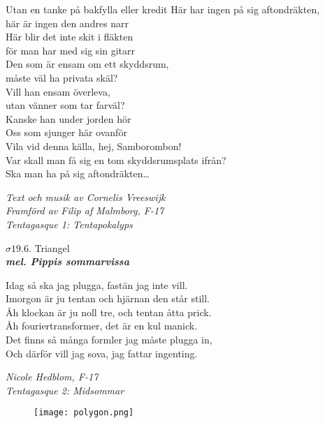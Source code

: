 \documentclass[a6paper,10pt]{article}
\newcommand{\mel}[1]{\small\textbf{\textit{mel. #1 \\}}}
\begin{document}
Utan en tanke på bakfylla eller kredit
\newpage
\setlength{\oddsidemargin}{-0.37in}
\noindent
Här har ingen på sig aftondräkten,\\
här är ingen den andres narr\\
Här blir det inte skit i fläkten\\
för man har med sig sin gitarr
\vspace{5pt}\\
Den som är ensam om ett skyddsrum,\\
måste väl ha privata skäl?\\
Vill han ensam överleva,\\
utan vänner som tar farväl?\\
Kanske han under jorden hör\\
Oss som sjunger här ovanför\\
Vila vid denna källa, hej, Samborombon!\\
Var skall man få sig en tom skyddsrumsplats ifrån?
\vspace{5pt}\\
Ska man ha på sig aftondräkten… 


\begin{flushright}
\textit{Text och musik av Cornelis Vreeswijk\\
Framförd av Filip af Malmborg, F-17\\ Tentagasque 1: Tentapokalyps}
\end{flushright}

\setlength{\oddsidemargin}{-0.47in}

\begin{center}
\Large $\sigma19.6$. Triangel\\
\mel{Pippis sommarvissa}
\end{center}\small 
Idag så ska jag plugga, fastän jag inte vill.\\
Imorgon är ju tentan och hjärnan den står still.\\
Åh klockan är ju noll tre, och tentan åtta prick.\\
Åh fouriertransformer, det är en kul manick.\\
Det finns så många formler jag måste plugga in,\\
Och därför vill jag sova, jag fattar ingenting.
\begin{flushright}
\textit{Nicole Hedblom, F-17 \\ Tentagasque 2: Midsommar}
\end{flushright}


\begin{figure}[!h]
\centering
\texttt{[image: polygon.png]}
\end{figure}
\end{document}
